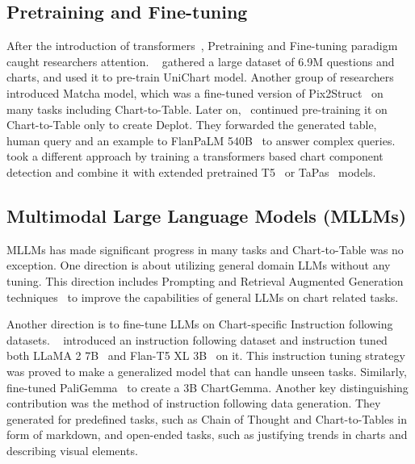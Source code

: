 \documentclass[
	letterpaper, %
]{jdf}
\begin{document}
    \subsection{Pretraining and Fine-tuning}\label{ssect:pretraining-and-fine-tuning}
After the introduction of transformers~\cite{vaswani2017attention}, Pretraining and Fine-tuning paradigm caught researchers attention.
~\cite{masry2023unichart} gathered a large dataset of 6.9M questions and charts, and used it to pre-train UniChart model.
Another group of researchers~\cite{liu2022matcha} introduced Matcha model, which was a fine-tuned version of Pix2Struct~\cite{lee2023pix2struct} on many tasks including Chart-to-Table.
Later on,~\cite{liu2022deplot} continued pre-training it on Chart-to-Table only to create Deplot.
They forwarded the generated table, human query and an example to FlanPaLM 540B~\cite{chung2024scaling} to answer complex queries.
~\cite{cheng2023chartreader} took a different approach by training a transformers based chart component detection and combine it with extended pretrained T5~\cite{raffel2020exploring} or TaPas~\cite{herzig2020tapas} models.

\subsection{Multimodal Large Language Models (MLLMs)}\label{ssect:mllm}
MLLMs has made significant progress in many tasks and Chart-to-Table was no exception.
One direction is about utilizing general domain LLMs without any tuning.
This direction includes Prompting and Retrieval Augmented Generation techniques~\cite{cao2024graphinsight, voigt2023vist5} to improve the capabilities of general LLMs on chart related tasks.

Another direction is to fine-tune LLMs on Chart-specific Instruction following datasets.
~\cite{masry2024chartinstruct} introduced an instruction following dataset and instruction tuned both LLaMA 2 7B~\cite{touvron2023llama} and Flan-T5 XL 3B~\cite{chung2024scaling} on it.
This instruction tuning strategy was proved to make a generalized model that can handle unseen tasks.
Similarly,~\cite{masry2024chartgemma} fine-tuned PaliGemma~\cite{beyer2024paligemma} to create a 3B ChartGemma.
Another key distinguishing contribution was the method of instruction following data generation.
They generated for predefined tasks, such as Chain of Thought and Chart-to-Tables in form of markdown, and open-ended tasks, such as justifying trends in charts and describing visual elements.
\end{document}
